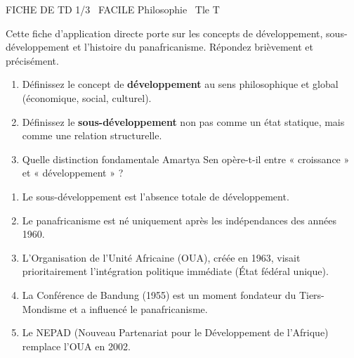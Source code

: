 \documentclass[11pt]{article}
\begin{document}
\begin{tcolorbox}[enhanced,colback=popink,colframe=popink,arc=10pt,boxrule=0pt,left=12pt,right=12pt,top=9pt,bottom=9pt]
{\color{white}\popxbold\small FICHE DE TD 1/3 \textbullet\ FACILE \hfill Philosophie \textbullet\ Tle T\par}
\end{tcolorbox}
\vspace{4pt}
\noindent Cette fiche d'application directe porte sur les concepts de développement, sous-développement et l'histoire du panafricanisme. Répondez brièvement et précisément.

\begin{exercice}
\begin{enumerate}
    \item Définissez le concept de \textbf{développement} au sens philosophique et global (économique, social, culturel).
    \item Définissez le \textbf{sous-développement} non pas comme un état statique, mais comme une relation structurelle.
    \item Quelle distinction fondamentale Amartya Sen opère-t-il entre « croissance » et « développement » ?
\end{enumerate}
\end{exercice}

\begin{exercice}
\begin{enumerate}
    \item Le sous-développement est l'absence totale de développement.
    \item Le panafricanisme est né uniquement après les indépendances des années 1960.
    \item L'Organisation de l'Unité Africaine (OUA), créée en 1963, visait prioritairement l'intégration politique immédiate (État fédéral unique).
    \item La Conférence de Bandung (1955) est un moment fondateur du Tiers-Mondisme et a influencé le panafricanisme.
    \item Le NEPAD (Nouveau Partenariat pour le Développement de l'Afrique) remplace l'OUA en 2002.
\end{enumerate}
\end{exercice}
\end{document}

